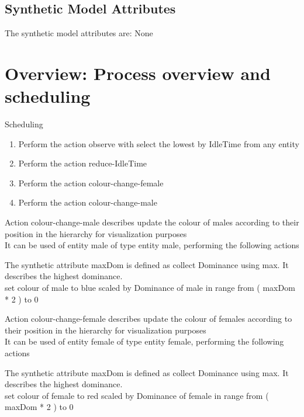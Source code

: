 \documentclass{article}
\begin{document}
\subsection{Synthetic Model Attributes}
The synthetic model attributes are: None
\section{Overview: Process overview and scheduling}
Scheduling
\begin{enumerate}
    \item Perform the action {\color{purple}observe} with select the lowest  by  {\color{blue}IdleTime}  from  any entity
    \item Perform the action {\color{purple}reduce-IdleTime}
    \item Perform the action {\color{purple}colour-change-female}
    \item Perform the action {\color{purple}colour-change-male}
\end{enumerate}
\parbox{\linewidth}{
Action {\color{purple}colour-change-male} describes update the colour of males according to their position in the hierarchy for visualization purposes\\
It can be used of entity male of type entity {\color{orange}male}, performing the following actions\\
\begin{algorithm}[H]
    The synthetic attribute {\color{blue}maxDom} is defined as collect Dominance using max. It describes the highest dominance.\\
     set colour of  {\color{blue}male}  to  blue scaled by {\color{blue}Dominance} of  {\color{blue}male}  in range from  ( {\color{orange}maxDom} * 2 )  to  0
\end{algorithm}
\hline
}
\parbox{\linewidth}{
Action {\color{purple}colour-change-female} describes update the colour of females according to their position in the hierarchy for visualization purposes\\
It can be used of entity {\color{orange}female} of type entity female, performing the following actions\\
\begin{algorithm}[H]
    The synthetic attribute {\color{blue}maxDom} is defined as collect Dominance using max. It describes the highest dominance.\\
    set colour of  {\color{orange}female}  to red scaled by Dominance of  {\color{blue}female}  in range from  ( {\color{blue}maxDom} * 2 )  to  0
\end{algorithm}
\hline
}
\end{document}
